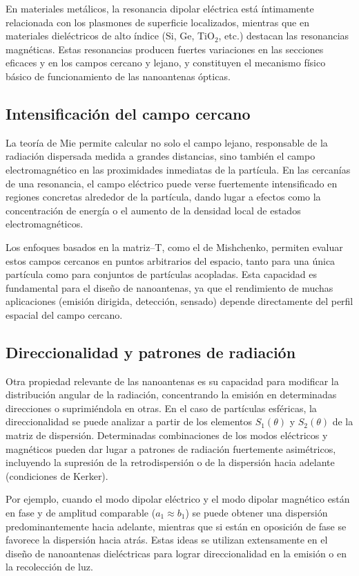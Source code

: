 \documentclass[12pt,a4paper]{article}
\begin{document}
En materiales metálicos, la resonancia dipolar eléctrica está íntimamente relacionada con los plasmones de superficie localizados, mientras que en materiales dieléctricos de alto índice
(Si, Ge, TiO$_2$, etc.) destacan las resonancias magnéticas.
Estas resonancias producen fuertes variaciones en las secciones eficaces y en los campos cercano y lejano, y constituyen el mecanismo físico básico de funcionamiento de las nanoantenas ópticas.

\subsection{Intensificación del campo cercano}

La teoría de Mie permite calcular no solo el campo lejano, responsable de la radiación dispersada medida a grandes distancias, sino también el campo electromagnético en las proximidades
inmediatas de la partícula.
En las cercanías de una resonancia, el campo eléctrico puede verse fuertemente intensificado en regiones concretas alrededor de la partícula, dando lugar a efectos como la concentración
de energía o el aumento de la densidad local de estados electromagnéticos.

Los enfoques basados en la matriz--T, como el de Mishchenko, permiten evaluar estos campos cercanos en puntos arbitrarios del espacio, tanto para una única partícula como para
conjuntos de partículas acopladas.
Esta capacidad es fundamental para el diseño de nanoantenas, ya que el rendimiento de muchas aplicaciones (emisión dirigida, detección, sensado) depende directamente
del perfil espacial del campo cercano.

\subsection{Direccionalidad y patrones de radiación}

Otra propiedad relevante de las nanoantenas es su capacidad para modificar la distribución angular de la radiación, concentrando la emisión en determinadas direcciones
o suprimiéndola en otras.
En el caso de partículas esféricas, la direccionalidad se puede analizar a partir de los elementos $S_1(\theta)$ y $S_2(\theta)$ de la matriz de dispersión.
Determinadas combinaciones de los modos eléctricos y magnéticos pueden dar lugar a patrones de radiación fuertemente asimétricos, incluyendo la supresión de la retrodispersión
o de la dispersión hacia adelante (condiciones de Kerker).

Por ejemplo, cuando el modo dipolar eléctrico y el modo dipolar magnético están en fase y de amplitud comparable ($a_1 \approx b_1$) se puede obtener una dispersión predominantemente
hacia adelante, mientras que si están en oposición de fase se favorece la dispersión hacia atrás.
Estas ideas se utilizan extensamente en el diseño de nanoantenas dieléctricas para lograr direccionalidad en la emisión o en la recolección de luz.
\end{document}

